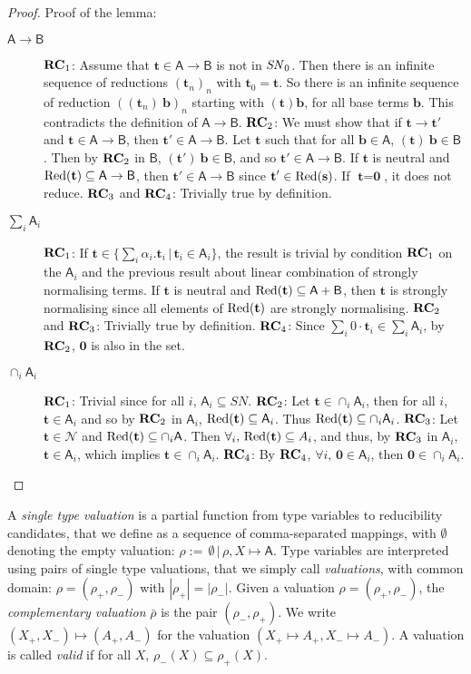 \documentclass[colorlinks=true,linkcolor=black,urlcolor=black,citecolor=blue,submission,copyright,creativecommons]{eptcs}
\newcommand{\ve}[1]{\mathrm{\textbf{#1}}}
\newcommand{\Neutral}{\mathcal{N}}
\newcommand{\SN}{{\it SN}_0}
\newcommand{\Red}{{\rm Red}}
\newcommand{\RCn}{{\bf RC}}
\newcommand{\bcal}[1]{\mathsf{#1}}
\begin{document}
\begin{proof}
\noindent Proof of the lemma:
  \begin{description}
   \item[$\bcal{A}\to\bcal{B}$]
	 $\RCn_1$: Assume that $\ve t\in\bcal{A}\to\bcal{B}$ is not in $\SN$. Then there is an infinite sequence of reductions $({\ve t}_n)_n$ with $\ve t_0 = \ve t$.  So there is an infinite sequence of reduction $((\ve t_n)~\ve b)_n$ starting with $(\ve t)\ve b$, for all base terms $\ve b$.  This contradicts the definition of $\bcal{A}\to\bcal{B}$.
$\RCn_2$: We must show that if $\ve t\to\ve t'$ and $\ve
         t\in\bcal{A}\to\bcal{B}$, then $\ve
         t'\in\bcal{A}\to\bcal{B}$. Let $\ve t$ such that for all $\ve b\in\bcal{A}$, $(\ve t)~\ve b\in\bcal{B}$. Then by $\RCn_2$ in $\bcal{B}$, $(\ve t')~\ve b\in\bcal{B}$, and so $\ve t'\in\bcal{A}\to\bcal{B}$.  If $\ve t$ is neutral and $\Red(\ve t)\subseteq\bcal{A}\to\bcal{B}$, then $\ve t'\in\bcal{A}\to\bcal{B}$ since $\ve t'\in\Red(\ve s)$. If $\ve t=\ve 0$, it does not reduce.
$\RCn_3$ and $\RCn_4$: Trivially true by definition.
\item[$\sum_i\bcal{A}_i$]
	 $\RCn_1$: If $\ve t\in \{\sum_i\alpha_i.\ve
           t_i\,|\,\ve t_i\in\bcal{A}_i\}$, the result is trivial by
           condition $\RCn_1$ on the $\bcal{A}_i$ and the previous result about linear combination of strongly normalising terms. If $\ve t$ is neutral and $\Red(\ve t)\subseteq\bcal{A}+\bcal{B}$, then $\ve t$ is strongly normalising since all elements of $\Red(\ve t)$ are strongly normalising.
$\RCn_2$ and $\RCn_3$: Trivially true by definition.
$\RCn_4$: Since $\sum_i0\cdot\ve
           t_i\in\sum_i\bcal{A}_i$, by $\RCn_2$, $\ve 0$ is also in
           the set.
\item[$\cap_i\bcal{A}_i$]
	 $\RCn_1$: Trivial since for all $i$, $\bcal{A}_i\subseteq SN$.
$\RCn_2$: Let $\ve t\in\cap_i\bcal{A}_i$, then for all $i$, $\ve t\in\bcal{A}_i$ and so by $\RCn_2$ in $\bcal{A}_i$, $\Red(\ve t)\subseteq\bcal{A}_i$. Thus $\Red(\ve t)\subseteq\cap_i\bcal{A}_i$.
$\RCn_3$: Let $\ve t\in\Neutral$ and $\Red(\ve t)\subseteq\cap_i\bcal{A}$. Then $\forall_i,\,\Red(\ve t)\subseteq A_i$, and thus, by $\RCn_3$ in $\bcal{A}_i$, $\ve t\in\bcal{A}_i$, which implies $\ve t\in\cap_i\bcal{A}_i$.
$\RCn_4$: By $\RCn_4$, $\forall i,\,\ve 0\in\bcal{A}_i$, then $\ve 0\in\cap_i\bcal{A}_i$.\qedhere
   \end{description}
\end{proof}

A \emph{single type valuation} is a partial function from type variables to reducibility candidates, that we define as a sequence of comma-separated mappings, with $\emptyset$ denoting the empty valuation:
$\rho:=\,\emptyset\,|\,\rho,X\mapsto\bcal{A}$.
Type variables are interpreted using pairs of single type valuations, that we simply call {\em valuations}, with common domain:
$\rho = (\rho_+,\rho_-)$ with $|\rho_+|=|\rho_-|$.
Given a valuation $\rho=(\rho_+,\rho_-)$, the {\em complementary valuation} $\bar\rho$ is the pair $(\rho_-,\rho_+)$. We write $(X_+,X_-)\mapsto(A_+,A_-)$ for the valuation $(X_+\mapsto A_+, X_-\mapsto A_-)$. A valuation is called \emph{valid} if for all $X$, $\rho_-(X)\subseteq\rho_+(X)$.
\end{document}
